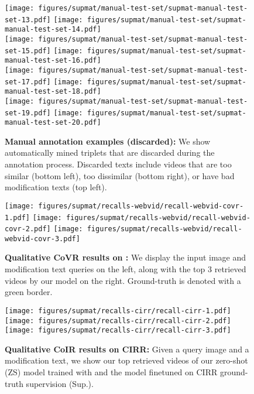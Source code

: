 \begin{figure}
    \centering
    {\texttt{[image: figures/supmat/manual-test-set/supmat-manual-test-set-13.pdf]}}\hfill
    {\texttt{[image: figures/supmat/manual-test-set/supmat-manual-test-set-14.pdf]}}\\\vspace{0.2cm}
    {\texttt{[image: figures/supmat/manual-test-set/supmat-manual-test-set-15.pdf]}}\hfill
    {\texttt{[image: figures/supmat/manual-test-set/supmat-manual-test-set-16.pdf]}}\\\vspace{0.2cm}
    {\texttt{[image: figures/supmat/manual-test-set/supmat-manual-test-set-17.pdf]}}\hfill
    {\texttt{[image: figures/supmat/manual-test-set/supmat-manual-test-set-18.pdf]}}\\\vspace{0.2cm}
    {\texttt{[image: figures/supmat/manual-test-set/supmat-manual-test-set-19.pdf]}}\hfill
    {\texttt{[image: figures/supmat/manual-test-set/supmat-manual-test-set-20.pdf]}}
    \caption{\textbf{Manual annotation examples (discarded):} We show automatically mined triplets that are discarded during the annotation process. Discarded texts include 
    videos that are too similar (bottom left), too dissimilar (bottom right), or have bad modification texts (top left).
    }
    \label{app:fig:manual-test-incorrect}
\end{figure}

\begin{figure}\centering
  \texttt{[image: figures/supmat/recalls-webvid/recall-webvid-covr-1.pdf]}
  \texttt{[image: figures/supmat/recalls-webvid/recall-webvid-covr-2.pdf]}
  \texttt{[image: figures/supmat/recalls-webvid/recall-webvid-covr-3.pdf]}
  \caption{\textbf{Qualitative CoVR results on \ourDSm:} We display the input image and modification text queries on the left, along with the top 3 retrieved videos by our model on the right. 
  Ground-truth is denoted with a green border.  
  }
  \label{app:fig:recall-webvid-covr}
\end{figure}

\begin{figure}\centering
  \texttt{[image: figures/supmat/recalls-cirr/recall-cirr-1.pdf]}
  \texttt{[image: figures/supmat/recalls-cirr/recall-cirr-2.pdf]}
  \texttt{[image: figures/supmat/recalls-cirr/recall-cirr-3.pdf]}
  \caption{\textbf{Qualitative CoIR results on CIRR:} Given a query image and a modification text, we show our top retrieved videos of our zero-shot (ZS) model trained with \ourDS and the model finetuned on CIRR ground-truth supervision (Sup.).
  }
  \label{app:fig:recall-cirrr}
\end{figure}